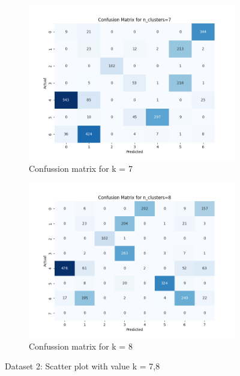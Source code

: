 \documentclass[12pt]{report}
\begin{document}
	\begin{figure}[H]
		\centering
		\begin{subfigure}{.5\textwidth}
			\centering
			\includegraphics[width=.9\linewidth]{../K-means/Output/Dataset2/confusionMatrix_k=7.png}
			\caption{Confussion matrix for k = 7}
			\label{Dataset2ConfusionMatrixk7}
		\end{subfigure}%
		\begin{subfigure}{.5\textwidth}
			\centering
			\includegraphics[width=.9\linewidth]{../K-means/Output/Dataset2/confusionMatrix_k=8.png}
			\caption{Confussion matrix for k = 8}
			\label{Dataset2ConfusionMatrixk8}
		\end{subfigure}
		\caption{Dataset 2: Scatter plot with value k = 7,8}
		\label{Dataset2ConfussionMatrix78}
	\end{figure}
\end{document}
